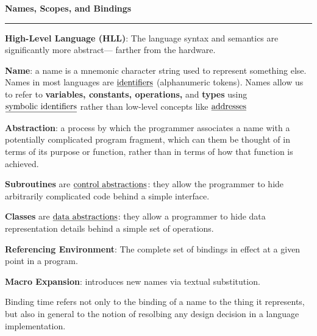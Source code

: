 \nopagenumbers
{\bf Names, Scopes, and Bindings}
\vskip 1mm
\hrule

\vskip 6pt
{\bf High-Level Language (HLL)}: The language syntax and semantics are significantly more abstract--- farther from the hardware.

\vskip 6pt
{\bf Name}: a name is a mnemonic character string used to represent something else. Names in most languages are $\underline{\hbox{identifiers}}$ (alphanumeric tokens). Names allow us to refer to {\bf variables, constants, operations,} and {\bf types} using $\underline{\hbox{symbolic identifiers}}$ rather than low-level concepts like $\underline{\hbox{addresses}}$

\vskip 6pt
{\bf Abstraction}: a process by which the programmer associates a name with a potentially complicated program fragment, which can them be thought of in terms of its purpose or function, rather than in terms of how that function is achieved.

\vskip 6pt
{\bf Subroutines} are $\underline{\hbox{control abstractions}}$: they allow the programmer to hide arbitrarily complicated code behind a simple interface.

\vskip 6pt
{\bf Classes} are $\underline{\hbox{data abstractions}}$: they allow a programmer to hide data representation details behind a simple set of operations.

\vskip 6pt
{\bf Referencing Environment}: The complete set of bindings in effect at a given point in a program.

\vskip 6pt
{\bf Macro Expansion}: introduces new names via textual substitution.

\vskip 6pt
Binding time refers not only to the binding of a name to the thing it represents, but also in general to the notion of resolbing any design decision in a language implementation.


\vfill\eject
\bye
